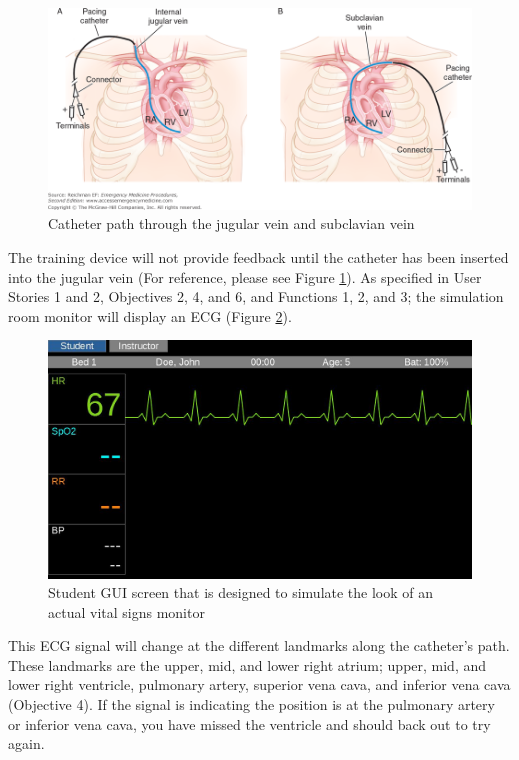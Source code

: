 \documentclass[12pt, titlepage]{article}
\begin{document}
\begin{figure}[H]
\centering
\includegraphics[scale=0.5]{transvenous}
\caption{Catheter path through the jugular vein and subclavian vein \cite{reichman2013emprocedures}}
\label{fig:procedure}
\end{figure}

The training device will not provide feedback until the catheter has been inserted into the jugular vein (For reference, please see Figure \ref{fig:procedure}). As specified in User Stories 1 and 2, Objectives 2, 4, and 6, and Functions 1, 2, and 3; the simulation room monitor will display an ECG (Figure \ref{fig:student}).

\begin{figure}[H]
\centering
\includegraphics[scale=0.5]{gui-student}
\caption{Student GUI screen that is designed to simulate the look of an actual vital signs monitor}
\label{fig:student}
\end{figure}

This ECG signal will change at the different landmarks along the catheter's path. These landmarks are the upper, mid, and lower right atrium; upper, mid, and lower right ventricle, pulmonary artery, superior vena cava, and inferior vena cava (Objective 4). If the signal is indicating the position is at the pulmonary artery or inferior vena cava, you have missed the ventricle and should back out to try again.
\end{document}
